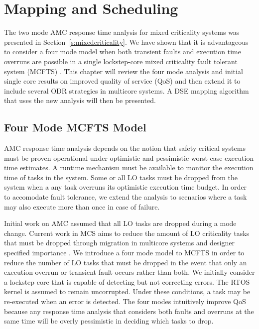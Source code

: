 
\chapter{Mapping and Scheduling} %

\label{c:sched} %


	The two mode AMC response time analysis for mixed criticality systems was presented in Section~\ref{s:mixedcriticality}. 
	We have shown that it is advantageous to consider a four mode model when both transient faults and execution time overruns are possible in a single lockstep-core mixed criticality fault tolerant system (MCFTS) \cite{albayati2016modes}. 
	This chapter will review the four mode analysis and initial single core results on improved quality of service (QoS) and then extend it to include several ODR strategies in multicore systems. 
	A DSE mapping algorithm that uses the new analysis will then be presented.

\section{Four Mode MCFTS Model}
\label{s:mcfts}
	AMC response time analysis depends on the notion that safety critical systems must be proven operational under optimistic and pessimistic worst case execution time estimates. 
	A runtime mechanism must be available to monitor the execution time of tasks in the system.
	Some or all LO tasks must be dropped from the system when a any task overruns its optimistic execution time budget.
	In order to accomodate fault tolerance, we extend the analysis to scenarios where a task may also execute more than once in case of failure.
	
	Initial work on AMC assumed that all LO tasks are dropped during a mode change. 
	Current work in MCS aims to reduce the amount of LO criticality tasks that must be dropped through migration in multicore systems \cite{al2015enhanced} and designer specified importance \cite{fleming2014incorporating}. 
	We introduce a four mode model to MCFTS in order to reduce the number of LO tasks that must be dropped in the event that only an execution overrun or transient fault occurs rather than both. 
	We initially consider a lockstep core that is capable of detecting but not correcting errors.
	The RTOS kernel is assumed to remain uncorrupted.
	Under these conditions, a task may be re-executed when an error is detected.
		The four modes intuitively improve QoS because any response time analysis that considers both faults and overruns at the same time will be overly pessimistic in deciding which tasks to drop.
	
